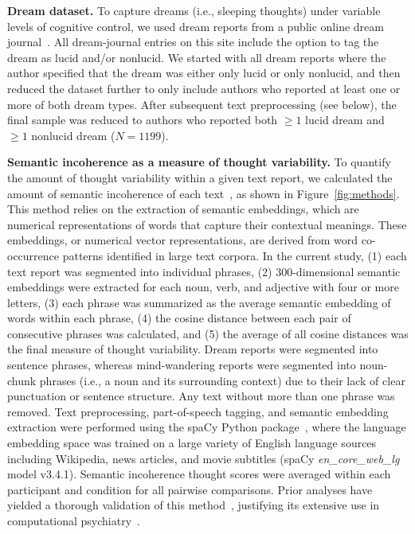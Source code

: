 \documentclass[10pt,a4paper,twocolumn]{article}
\begin{document}
\textbf{Dream dataset.}
To capture dreams (i.e., sleeping thoughts) under variable levels of cognitive control, we used dream reports from a public online dream journal~\cite{dreamviews,schredl2022}. All dream-journal entries on this site include the option to tag the dream as lucid and/or nonlucid. We started with all dream reports where the author specified that the dream was either only lucid or only nonlucid, and then reduced the dataset further to only include authors who reported at least one or more of both dream types. After subsequent text preprocessing (see below), the final sample was reduced to authors who reported both $\ge 1$ lucid dream and $\ge 1$ nonlucid dream ($\mathit{N}=1199$).

\textbf{Semantic incoherence as a measure of thought variability.}
To quantify the amount of thought variability within a given text report, we calculated the amount of semantic incoherence of each text~\cite{bedi2015,elvevag2007}, as shown in Figure~\ref{fig:methods}. This method relies on the extraction of semantic embeddings, which are numerical representations of words that capture their contextual meanings. These embeddings, or numerical vector representations, are derived from word co-occurrence patterns identified in large text corpora. In the current study, (1) each text report was segmented into individual phrases, (2) 300-dimensional semantic embeddings were extracted for each noun, verb, and adjective with four or more letters, (3) each phrase was summarized as the average semantic embedding of words within each phrase, (4) the cosine distance between each pair of consecutive phrases was calculated, and (5) the average of all cosine distances was the final measure of thought variability. Dream reports were segmented into sentence phrases, whereas mind-wandering reports were segmented into noun-chunk phrases (i.e., a noun and its surrounding context) due to their lack of clear punctuation or sentence structure. Any text without more than one phrase was removed. Text preprocessing, part-of-speech tagging, and semantic embedding extraction were performed using the spaCy Python package~\cite{montani2023}, where the language embedding space was trained on a large variety of English language sources including Wikipedia, news articles, and movie subtitles (spaCy \textit{en\_core\_web\_lg} model v3.4.1). Semantic incoherence thought scores were averaged within each participant and condition for all pairwise comparisons. Prior analyses have yielded a thorough validation of this method~\cite{bedi2015,elvevag2007}, justifying its extensive use in computational psychiatry~\cite{corcoran2020a,deboer2018}.
\end{document}
